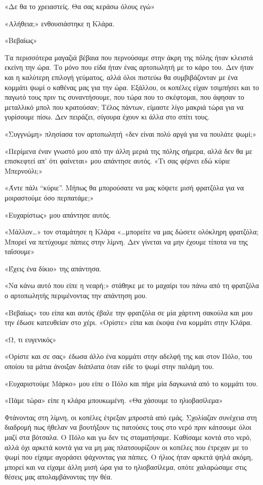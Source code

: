 \documentclass[12pt,twoside, openany]{book}
\begin{document}
«Δε θα το χρειαστείς. Θα σας κεράσω όλους εγώ»

«Αλήθεια;» ενθουσιάστηκε η Κλάρα.

«Βεβαίως»

Τα περισσότερα μαγαζιά βέβαια που περνούσαμε στην άκρη της πόλης ήταν κλειστά εκείνη την ώρα. Το μόνο που είδα ήταν ένας αρτοπωλητή με το κάρο του. Δεν ήταν και η καλύτερη επιλογή γεύματος, αλλά όλοι πιστεύω θα συμβιβάζονταν με ένα κομμάτι ψωμί ο καθένας μας για την ώρα. Εξάλλου, οι κοπέλες είχαν τσιμπήσει και το παγωτό τους πριν τις συναντήσουμε, που τώρα που το σκέφτομαι, που άφησαν το μεταλλικό μπολ που κρατούσαν; Τέλος πάντων, είμαστε λίγο μακριά τώρα για να γυρίσουμε πίσω. Δεν πειράζει, σίγουρα έχουν κι άλλα στο σπίτι τους.

«Συγγνώμη» πλησίασα τον αρτοπωλητή «δεν είναι πολύ αργά για να πουλάτε ψωμί;»

«Περίμενα έναν γνωστό μου από την άλλη μεριά της πόλης σήμερα, αλλά δεν θα με επισκεφτεί απ’ ότι φαίνεται» μου απάντησε αυτός. «Τι σας φέρνει εδώ κύριε Μπερνούλι;»

«Άντε πάλι “κύριε”. Μήπως θα μπορούσατε να μας κόψετε μισή φρατζόλα για να μοιραστούμε όσο περπατάμε;»

«Ευχαρίστως» μου απάντησε αυτός.

«Μάλλον…» τον σταμάτησε η Κλάρα «…μπορείτε να μας δώσετε ολόκληρη φρατζόλα; Μπορεί να πετύχουμε πάπιες στην λίμνη. Δεν γίνεται να μην έχουμε τίποτα να της ταΐσουμε»

«Έχεις ένα δίκιο» της απάντησα.

«Να κάνω αυτό που είπε η νεαρή;» στάθηκε με το μαχαίρι του πάνω από τη φρατζόλα ο αρτοπωλητής περιμένοντας την απάντηση μου.

«Βεβαίως» του είπα και αυτός έβαλε την φρατζόλα σε μία χάρτινη σακούλα και μου την έδωσε κατευθείαν στο χέρι. «Ορίστε» είπα και έκοψα ένα κομμάτι στην Κλάρα.

«Ω, τι ευγενικός»

«Ορίστε και σε σας» έδωσα άλλο ένα κομμάτι στην αδελφή της και στον Πόλο, του οποίου τα μάτια άνοιξαν διάπλατα όταν είδε το ψωμί στην παλάμη του.

«Ευχαριστούμε Μάρκο» μου είπε ο Πόλο και πήρε μία δαγκωνιά από το κομμάτι του.

«Πάμε τώρα» είπε η κλάρα μπουκωμένη. «Θα χάσουμε το ηλιοβασίλεμα»\newline\newline

Φτάνοντας στη λίμνη, οι κοπέλες έτρεξαν μπροστά από εμάς. Σχολίαζαν συνέχεια στη διαδρομή πως ήθελαν να βουτήξουν τις πατούσες τους στο νερό πριν κάτσουμε όλοι μαζί στα βότσαλα. Ο Πόλο και γω δεν τις σταματήσαμε. Καθίσαμε κοντά στο νερό, αλλά όχι αρκετά κοντά για να μη μας πλατσουρίζουν οι κοπέλες που έτρεχαν με το ψωμί που είχαμε αγοράσει ψάχνοντας για πάπιες. Ο ήλιος ήταν αρκετά ψηλά ακόμη, μπορεί και να είχαμε άλλη μισή ώρα για το ηλιοβασίλεμα, οπότε χαλαρώσαμε στις θέσεις μας απολαμβάνοντας την θέα.
\end{document}
